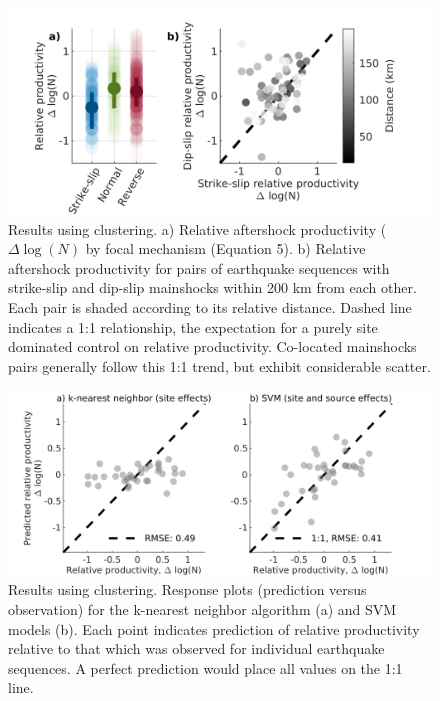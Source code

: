 \documentclass[draft]{agujournal}
\begin{document}
\begin{figure}[H]
    \centering

        \includegraphics{figures/fmspairs_z2008.png}
    
    \caption{Results using \citet{Zaliapin2008} clustering. a) Relative aftershock productivity ($\Delta \log(N)$ by focal mechanism (Equation 5). b) Relative aftershock productivity for pairs of earthquake sequences with strike-slip and dip-slip mainshocks within 200 km from each other. Each pair is shaded according to its relative distance. Dashed line indicates a 1:1 relationship, the expectation for a purely site dominated control on relative productivity. Co-located mainshocks pairs generally follow this 1:1 trend, but exhibit considerable scatter.}
        \label{fig:coloc_z2008}
\end{figure}
\begin{figure}[H]
    \centering

        \includegraphics{figures/response_z2008.png}
    
    \caption{Results using \citet{Zaliapin2008} clustering. Response plots (prediction versus observation) for the k-nearest neighbor algorithm (a) and SVM models (b). Each point indicates prediction of relative productivity relative to that which was observed for individual earthquake sequences. A perfect prediction would place all values on the 1:1 line.}
        \label{fig:response_z2008}
\end{figure}
\end{document}
